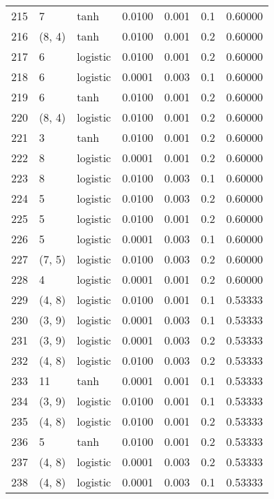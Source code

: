 \begin{tabular}{lllrrrr}
215 &           7 &      tanh &  0.0100 &  0.001 &  0.1 &   0.60000 \\
216 &      (8, 4) &      tanh &  0.0100 &  0.001 &  0.2 &   0.60000 \\
217 &           6 &  logistic &  0.0100 &  0.001 &  0.2 &   0.60000 \\
218 &           6 &  logistic &  0.0001 &  0.003 &  0.1 &   0.60000 \\
219 &           6 &      tanh &  0.0100 &  0.001 &  0.2 &   0.60000 \\
220 &      (8, 4) &  logistic &  0.0100 &  0.001 &  0.2 &   0.60000 \\
221 &           3 &      tanh &  0.0100 &  0.001 &  0.2 &   0.60000 \\
222 &           8 &  logistic &  0.0001 &  0.001 &  0.2 &   0.60000 \\
223 &           8 &  logistic &  0.0100 &  0.003 &  0.1 &   0.60000 \\
224 &           5 &  logistic &  0.0100 &  0.003 &  0.2 &   0.60000 \\
225 &           5 &  logistic &  0.0100 &  0.001 &  0.2 &   0.60000 \\
226 &           5 &  logistic &  0.0001 &  0.003 &  0.1 &   0.60000 \\
227 &      (7, 5) &  logistic &  0.0100 &  0.003 &  0.2 &   0.60000 \\
228 &           4 &  logistic &  0.0001 &  0.001 &  0.2 &   0.60000 \\
229 &      (4, 8) &  logistic &  0.0100 &  0.001 &  0.1 &   0.53333 \\
230 &      (3, 9) &  logistic &  0.0001 &  0.003 &  0.1 &   0.53333 \\
231 &      (3, 9) &  logistic &  0.0001 &  0.003 &  0.2 &   0.53333 \\
232 &      (4, 8) &  logistic &  0.0100 &  0.003 &  0.2 &   0.53333 \\
233 &          11 &      tanh &  0.0001 &  0.001 &  0.1 &   0.53333 \\
234 &      (3, 9) &  logistic &  0.0100 &  0.001 &  0.1 &   0.53333 \\
235 &      (4, 8) &  logistic &  0.0100 &  0.001 &  0.2 &   0.53333 \\
236 &           5 &      tanh &  0.0100 &  0.001 &  0.2 &   0.53333 \\
237 &      (4, 8) &  logistic &  0.0001 &  0.003 &  0.2 &   0.53333 \\
238 &      (4, 8) &  logistic &  0.0001 &  0.003 &  0.1 &   0.53333 \\

\end{tabular}
